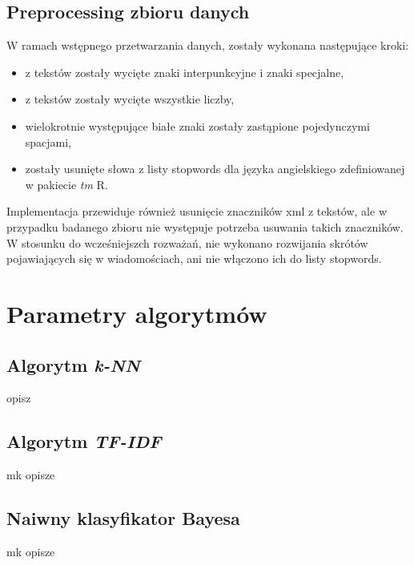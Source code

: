 \documentclass[a4paper,12pt]{article}
\begin{document}
\subsection{Preprocessing zbioru danych}

W ramach wstępnego przetwarzania danych, zostały wykonana następujące kroki:

\begin{itemize}
\item z tekstów zostały wycięte znaki interpunkcyjne i znaki specjalne,
\item z tekstów zostały wycięte wszystkie liczby,
\item wielokrotnie występujące białe znaki zostały zastąpione pojedynczymi spacjami,
\item zostały usunięte słowa z listy stopwords dla języka angielskiego zdefiniowanej w pakiecie \textit{tm} R.
\end{itemize}

Implementacja przewiduje również usunięcie znaczników xml z tekstów, ale w przypadku badanego zbioru nie występuje potrzeba usuwania takich znaczników. W stosunku do wcześniejszch rozważań, nie wykonano rozwijania skrótów pojawiających się w wiadomościach, ani nie włączono ich do listy stopwords.

\section{Parametry algorytmów} %

\subsection{Algorytm \textit{k-NN}}

opisz

\subsection{Algorytm \textit{TF-IDF}}

mk opisze

\subsection{Naiwny klasyfikator Bayesa}

mk opisze
\end{document}
